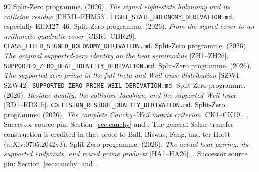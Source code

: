 \documentclass[11pt,a4paper]{article}
\theoremstyle{definition}\newtheorem{definition}[theorem]{Definition}\newtheorem{remark}[theorem]{Remark}
\begin{document}
\begin{thebibliography}{99}
 Split-Zero programme. (2026). \emph{The signed eight-state holonomy and its collision residue} [EHM1--EHM53]. \texttt{EIGHT\_STATE\_HOLONOMY\_DERIVATION.md}, especially EHM27--46.
 Split-Zero programme. (2026). \emph{From the signed cover to an arithmetic quadratic cover} [CBR1--CBR29]. \texttt{CLASS\_FIELD\_SIGNED\_HOLONOMY\_DERIVATION.md}.
 Split-Zero programme. (2026). \emph{The original supported-zero identity on the heat semimodule} [ZH1--ZH26]. \texttt{SUPPORTED\_ZERO\_HEAT\_IDENTITY\_DERIVATION.md}.
 Split-Zero programme. (2026). \emph{The supported-zero prime in the full theta and Weil trace distribution} [SZW1--SZW42]. \texttt{SUPPORTED\_ZERO\_PRIME\_WEIL\_DERIVATION.md}.
 Split-Zero programme. (2026). \emph{Residue duality, the collision Jacobian, and the supported Weil trace} [RD1--RD31b]. \texttt{COLLISION\_RESIDUE\_DUALITY\_DERIVATION.md}.
 Split-Zero programme. (2026). \emph{The complete Cauchy--Weil matrix criterion} [CK1--CK19]. . Successor source pin: Section~\ref{sec:cauchy} and . The general Schur transfer construction is credited in that proof to Ball, Biswas, Fang, and ter Horst (arXiv:0705.2042v3).
 Split-Zero programme. (2026). \emph{The actual heat pairing, its supported endpoints, and mixed prime products} [HA1--HA26]. . Successor source pin: Section~\ref{sec:cauchy} and .
\end{thebibliography}
\end{document}
